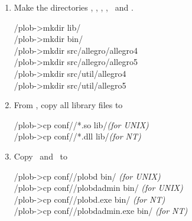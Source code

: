 \begin{enumerate}

\item Make the directories ,
  , ,
  ,
  \ and
  .\\[\smallskipamount]
\begin{tt}\CodeSize
\td/plob-\thisversion>mkdir lib/\shortosname\\
\td/plob-\thisversion>mkdir bin/\shortosname\\
\td/plob-\thisversion>mkdir src/allegro/allegro4\\
\td/plob-\thisversion>mkdir src/allegro/allegro5\\
\td/plob-\thisversion>mkdir src/util/allegro4\\
\td/plob-\thisversion>mkdir src/util/allegro5
\end{tt}

\item From , copy all library files to
\\[\smallskipamount]
\begin{tt}\CodeSize
  \td/plob-\thisversion>cp conf/\shortosname/*.so
  lib/\shortosname\hspace*{\fill}\textrm{\emph{(for UNIX)}}\\ 
  \td/plob-\thisversion>cp conf/\shortosname/*.dll
  lib/\shortosname\hspace*{\fill}\textrm{\emph{(for NT)}}
\end{tt}

\item Copy \ and
   \ to
  \\[\smallskipamount]
\begin{tt}\CodeSize
  \td/plob-\thisversion>cp conf/\shortosname/plobd bin/\shortosname
  \hspace*{\fill}\textrm{\emph{(for UNIX)}}\\ \td/plob-\thisversion>cp
  conf/\shortosname/plobdadmin bin/\shortosname
  \hspace*{\fill}\textrm{\emph{(for UNIX)}}\\ \td/plob-\thisversion>cp
  conf/\shortosname/plobd.exe bin/\shortosname
  \hspace*{\fill}\textrm{\emph{(for NT)}}\\ \td/plob-\thisversion>cp
  conf/\shortosname/plobdadmin.exe bin/\shortosname
  \hspace*{\fill}\textrm{\emph{(for NT)}}
\end{tt}


\end{enumerate}
